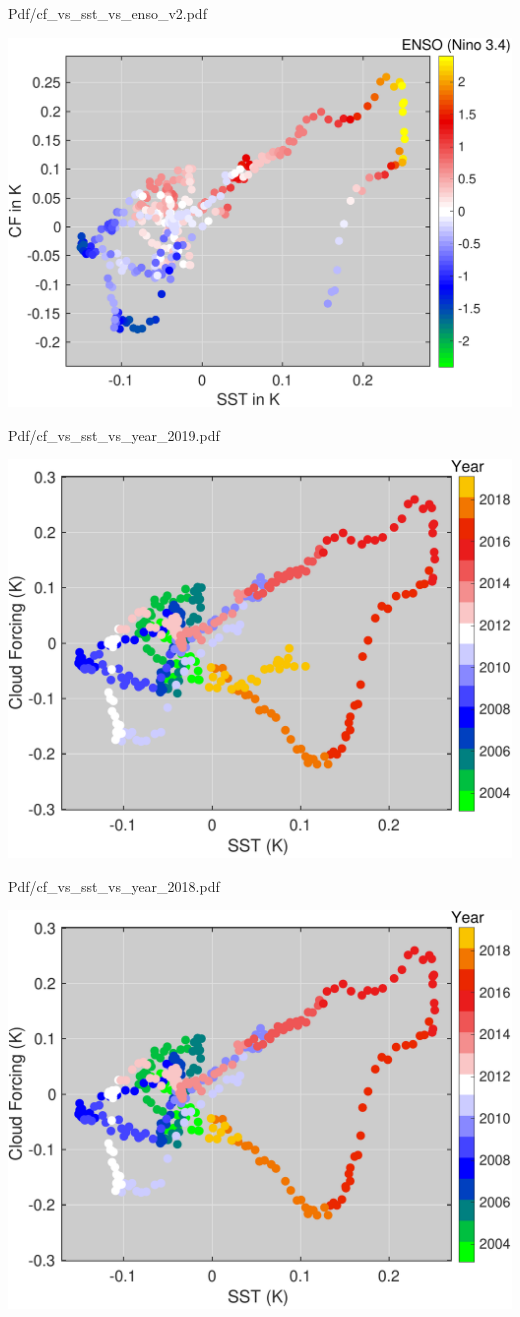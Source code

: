 \documentclass[presentation]{beamer}
\begin{document}
\begin{frame}[label={sec:org8d3db40}]{Pdf/cf\_vs\_sst\_vs\_enso\_v2.pdf}
\begin{center}
\includegraphics[width=0.7\linewidth]{./Figs/Pdf/cf_vs_sst_vs_enso_v2.pdf}
\end{center}
\end{frame}

\begin{frame}[label={sec:orgd36355f}]{Pdf/cf\_vs\_sst\_vs\_year\_2019.pdf}
\begin{center}
\includegraphics[width=0.7\linewidth]{./Figs/Pdf/cf_vs_sst_vs_year_2019.pdf}
\end{center}
\end{frame}

\begin{frame}[label={sec:orga69d92d}]{Pdf/cf\_vs\_sst\_vs\_year\_2018.pdf}
\begin{center}
\includegraphics[width=0.7\linewidth]{./Figs/Pdf/cf_vs_sst_vs_year_2018.pdf}
\end{center}
\end{frame}
\end{document}
